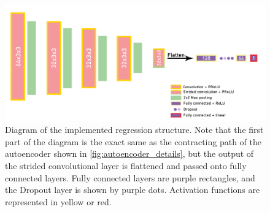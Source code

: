 \begin{figure}[!ht]
    \centering
    \includegraphics[width=.85\textwidth]{dissertation/figures/regression_final_structure.png}
    \caption{Diagram of the implemented regression structure. Note that the first part of the diagram is the exact same as the contracting path of the autoencoder shown in \ref{fig:autoencoder_details}, but the output of the strided convolutional layer is flattened and passed onto fully connected layers. Fully connected layers are purple rectangles, and the Dropout layer is shown by purple dots. Activation functions are represented in yellow or red.}
    \label{fig:regression_details}
\end{figure}